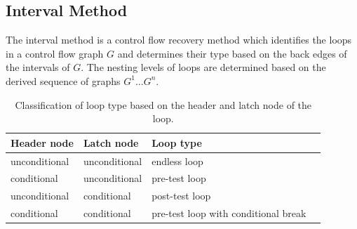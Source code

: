 
\subsection{Interval Method}
\label{sec:interval_method}


The interval method is a control flow recovery method which identifies the loops in a control flow graph $G$ and determines their type based on the back edges of the intervals of $G$. The nesting levels of loops are determined based on the derived sequence of graphs $G^1 \dots G^n$.







\begin{table}[htbp]
	\begin{center}
		\begin{tabular}{|l|l|l|l|}
			\hline
			\textbf{Header node} & \textbf{Latch node} & \textbf{Loop type} \\
			\hline
			unconditional & unconditional & endless loop                         \\
			\hline
			conditional   & unconditional & pre-test loop                        \\
			\hline
			unconditional & conditional   & post-test loop                       \\
			\hline
			conditional   & conditional   & pre-test loop with conditional break \\
			\hline
		\end{tabular}
	\end{center}
	\label{tbl:loop_classification}
	\caption{Classification of loop type based on the header and latch node of the loop.}
\end{table}

